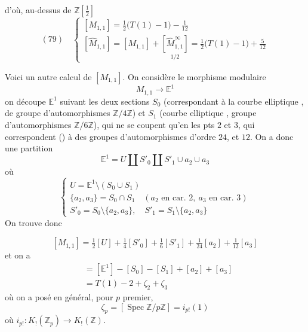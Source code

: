 \documentclass[11pt,a4paper]{article}
\begin{document}
d'où, au-dessus de $\mathbb{Z}[\frac12]$
\[
(79)\quad
\begin{cases}
[M_{1,1}] = \tfrac12\bigl(T(1) - 1\bigr) - \tfrac{1}{12} \\
[\widehat{M}_{1,1}] = [M_{1,1}] + \underset{1/2}{[\widehat{M}^{\infty}_{1,1}]} = \tfrac12\bigl(T(1) - 1\bigr) + \tfrac{5}{12}
\end{cases}
\]

Voici un autre calcul de $[M_{1,1}]$. On considère le morphisme modulaire
\[
M_{1,1} \longrightarrow \mathbb{E}^1
\]
 on découpe $\mathbb{E}^1$ suivant les deux sections $S_0$ (correspondant à la courbe elliptique , de groupe d'automorphismes $\mathbb{Z}/4\mathbb{Z}$) et $S_1$ \struck{\ill{}} (courbe elliptique , \ill{} groupe d'automorphismes $\mathbb{Z}/6\mathbb{Z}$), qui ne se coupent qu'en les pts $2$ et $3$, qui correspondent (\ill{}) à des groupes d'automorphismes d'ordre $24$, et $12$. On a donc une partition
\[
\mathbb{E}^1 = U \amalg S'_0 \amalg S'_1 \cup a_2 \cup a_3
\]
où
\[
\begin{cases}
U = \mathbb{E}^1 \setminus (S_0 \cup S_1) \\
\{a_2, a_3\} = S_0 \cap S_1 \quad (a_2 \text{ en car. } 2,\ a_3 \text{ en car. } 3) \\
S'_0 = S_0 \setminus \{a_2, a_3\},\quad S'_1 = S_1 \setminus \{a_2, a_3\}
\end{cases}
\]
On trouve donc

\[
[M_{1,1}] = \tfrac12 [U] + \tfrac14 [S'_0] + \tfrac16 [S'_1] + \tfrac{1}{24} [a_2] + \tfrac{1}{12} [a_3]
\]
et on a
\begin{align*}
[U] &= [\mathbb{E}^1] - [S_0] - [S_1] + [a_2] + [a_3] \\
&= T(1) - 2 + \zeta_2 + \zeta_3
\end{align*}
où on a posé en général, pour $p$ premier,
\[
\zeta_p = [\operatorname{Spec} \mathbb{Z}/p\mathbb{Z}] = i_{p!}(1)
\]
où $i_{p!} : K_!(\mathbb{Z}_p) \longrightarrow K_!(\mathbb{Z})$.
\end{document}
